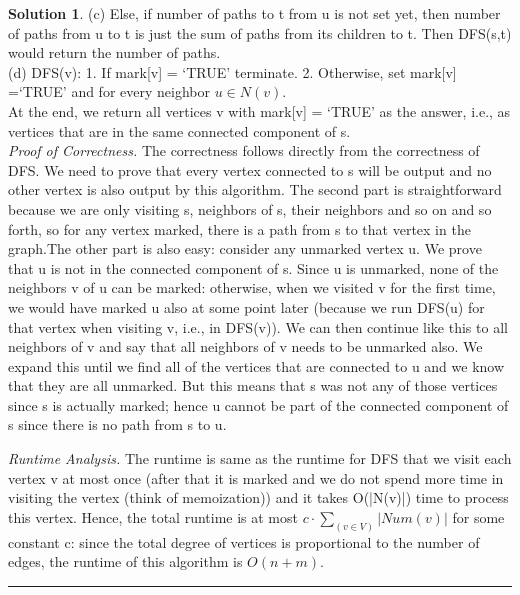 \documentclass{article}
\theoremstyle{definition}
\def\fline{\rule{0.75\linewidth}{0.5pt}}
\newcommand{\finishline}{\begin{center}\fline\end{center}}
\newtheorem*{solution*}{Solution}
\newenvironment{solution}{\begin{solution*}}{{\finishline} \end{solution*}}
\begin{document}
\begin{solution}
	(c) Else, if number of paths to t from u is not set yet, then number of paths from u to t is just the sum of paths from its children to t. Then DFS(s,t) would return the number of paths. \\
	
	(d) DFS(v): 1. If mark[v] = ‘TRUE’ terminate. 2. Otherwise, set mark[v] =‘TRUE’ and for every neighbor $u \in N(v)$. \\
	
	At the end, we return all vertices v with mark[v] = ‘TRUE’ as the answer, i.e., as vertices that are in the same connected component of s. \\
  
	\emph{Proof of Correctness.} The correctness follows directly from the correctness of DFS. We need to prove that every vertex connected to s will be output and no other vertex is also output by this algorithm. The second part is straightforward because we are only visiting s, neighbors of s, their neighbors and so on and so forth, so for any vertex marked, there is a path from s to that vertex in the graph.The other part is also easy: consider any unmarked vertex u. We prove that u is not in the connected component of s. Since u is unmarked, none of the neighbors v of u can be marked: otherwise, when we visited v for the first time, we would have marked u also at some point later (because we run DFS(u) for that vertex when visiting v, i.e., in DFS(v)). We can then continue like this to all neighbors of v and say that all neighbors of v needs to be unmarked also. We expand this until we find all of the vertices that are connected to u and we know that they are all unmarked. But this means that s was not any of those vertices since s is actually marked; hence u cannot be part of the connected component of s since there is no path from s to u.

	\emph{Runtime Analysis.} The runtime is same as the runtime for DFS that we visit each vertex v at most once (after that it is marked and we do not spend more time in visiting the vertex (think of memoization)) and it takes O(|N(v)|) time to process this vertex. Hence, the total runtime is at most $c · \sum _(v \in V) |Num(v)|$ for some constant c: since the total degree of vertices is proportional to the number of edges, the runtime of this algorithm is $O(n + m)$.

\end{solution}

\bigskip
\end{document}
